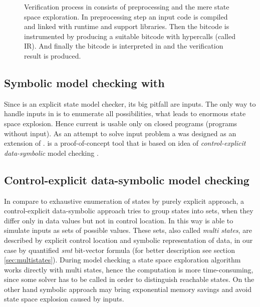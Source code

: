 \begin{figure}[!ht]

\caption{Verification process in \DIVINE consists of preprocessing and
the mere state space exploration. In preprocessing step an input code is
compiled and linked with \DIOS runtime and \DIVINE support
libraries. Then the bitcode is instrumented by \LART producing a suitable \LLVM bitcode with \DIVM hypercalls (called \DIVM IR). And finally the bitcode is interpreted in \DIVM and the verification result is produced.}\label{fig:verification}
\end{figure}

\subsection{Symbolic model checking with \SymDIVINE}

Since \DIVINE is an explicit state model checker, its big pitfall are inputs. The
only way to handle inputs in \DIVINE is to enumerate all possibilities, what
leads to enormous state space explosion. Hence current \DIVINE is usable only on
closed programs (programs without input). As an attempt to solve input problem a
\SymDIVINE was designed as an extension of \DIVINE. \SymDIVINE is
a proof-of-concept tool that is based on idea of \emph{control-explicit data-symbolic}
model checking \cite{Barnat14}.

\subsection{Control-explicit data-symbolic model checking}

In compare to exhaustive enumeration of states by purely explicit approach, a
control-explicit data-symbolic approach tries to group states into sets, when
they differ only in data values but not in control location. In this way \SymDIVINE is able to
simulate inputs as sets of possible values. These sets, also called \emph{multi states}, are described by explicit control location and symbolic representation of
data, in our case by quantified \emph{smt} bit-vector formula (for better description see section
\autoref{sec:multistates}). During model checking a state space exploration
algorithm works directly with multi states, hence the computation is more
time-consuming, since some \SMT solver has to be called in order to
distinguish reachable states. On the other hand symbolic approach may bring
exponential memory savings and avoid state space explosion caused by inputs.

